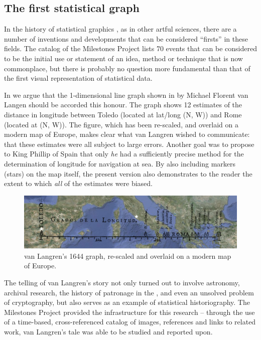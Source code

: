 \subsection{The first statistical graph}
In the history of statistical graphics \citep{Friendly:06:hbook}, as in other 
artful sciences, there are a number of inventions and developments that can be 
considered ``firsts'' in these fields.
The catalog of the Milestones Project \citep{FriendlyDenis:01} lists 70 events 
that can be considered to be the initial use or statement of an idea, method or 
technique that is now commonplace, but there is probably no question more 
fundamental than that of the first visual representation of statistical data.

In \citet{Friendly-etal:2010:langren} we argue that the 1-dimensional line 
graph shown in  by Michael Florent van 
Langen \citep{Langren:1644} should be accorded this honour. The graph shows 12 estimates of the distance in longitude between Toledo (located at lat/long %
(N, W)) and Rome (located at (N, W)).  
The figure, which has been re-scaled, and overlaid on a modern map of Europe, makes clear what van Langren wished to communicate: 
that these estimates were all subject to large errors.
Another goal was to propose to King Phillip of Spain that only \emph{he} had a sufficiently precise method for the determination of 
longitude for navigation at sea.  
By also including markers (stars) on the map itself, the present version also demonstrates to the reader the extent to which \emph{all} of 
the estimates were biased.

\begin{figure}[htb]
 \centering
 \includegraphics[width=\textwidth]{fig/langren-google-overlay2}
 \caption{van Langren's 1644 graph, re-scaled and overlaid on a modern map of Europe.}%
\label{fig:langren-google-overlay}
\end{figure}

The telling of van Langren's story not only turned out to involve astronomy, 
archival research, the history of patronage in the , and even an 
unsolved problem of cryptography, but also serves as an example of statistical 
historiography.
The Milestones Project provided the infrastructure for this research -- through 
the use of a time-based, cross-referenced catalog of images, references and 
links to related work, van Langren's tale was able to be studied and reported 
upon.

